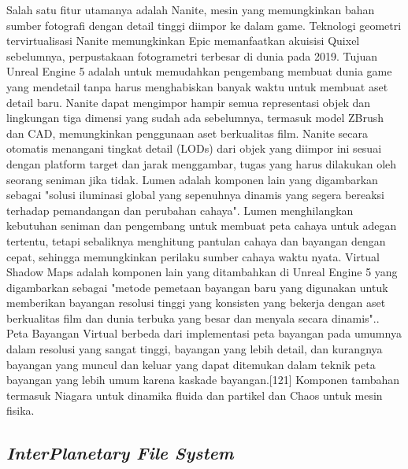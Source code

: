 Salah satu fitur utamanya adalah Nanite, mesin yang memungkinkan bahan sumber fotografi dengan detail tinggi diimpor ke dalam game.\parencite{ValentineRebekah} Teknologi geometri tervirtualisasi Nanite memungkinkan Epic memanfaatkan akuisisi Quixel sebelumnya, perpustakaan fotogrametri terbesar di dunia pada 2019. Tujuan Unreal Engine 5 adalah untuk memudahkan pengembang
membuat dunia game yang mendetail tanpa harus menghabiskan banyak waktu untuk membuat aset detail baru.\parencite{DeanTakahashi} Nanite dapat mengimpor hampir semua representasi objek dan lingkungan tiga dimensi yang sudah ada sebelumnya, termasuk model ZBrush dan CAD, memungkinkan penggunaan aset berkualitas film.\parencite{AndrewTarantola} Nanite secara otomatis menangani tingkat detail (LODs)
dari objek yang diimpor ini sesuai dengan platform target dan jarak menggambar, tugas yang harus dilakukan oleh seorang seniman jika tidak.\parencite{KyleOrland} Lumen adalah komponen lain yang digambarkan sebagai "solusi iluminasi global yang sepenuhnya dinamis yang segera bereaksi terhadap pemandangan dan perubahan cahaya". Lumen menghilangkan kebutuhan
seniman dan pengembang untuk membuat peta cahaya untuk adegan tertentu, tetapi sebaliknya menghitung pantulan cahaya dan bayangan dengan cepat, sehingga memungkinkan perilaku sumber cahaya waktu nyata.\parencite{KyleOrland} Virtual Shadow Maps adalah komponen lain yang ditambahkan di Unreal Engine 5 yang digambarkan sebagai "metode pemetaan bayangan baru yang digunakan
untuk memberikan bayangan resolusi tinggi yang konsisten yang bekerja dengan aset berkualitas film dan dunia terbuka yang besar dan menyala secara dinamis"..\parencite{VirtualShadowMaps} Peta Bayangan Virtual berbeda dari implementasi peta bayangan pada umumnya dalam resolusi yang sangat tinggi, bayangan yang lebih detail, dan kurangnya bayangan yang muncul dan keluar yang
dapat ditemukan dalam teknik peta bayangan yang lebih umum karena kaskade bayangan.[121] Komponen tambahan termasuk Niagara untuk dinamika fluida dan partikel dan Chaos untuk mesin fisika.\parencite{DeanTakahashi}

\subsection{\emph{InterPlanetary File System}}

